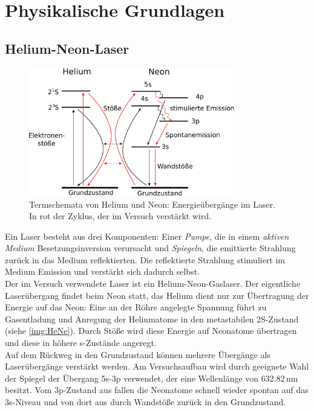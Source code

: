 \section{Physikalische Grundlagen}

\subsection{Helium-Neon-Laser}

\begin{figure}[H]
\begin{center}
  \includegraphics[width=0.8\textwidth]{../img/HeNe.pdf}
  \caption{Termschemata von Helium und Neon: Energieübergänge im Laser.
  In rot der Zyklus, der im Versuch verstärkt wird.}
  \label{img:HeNe}
\end{center}
\end{figure}


Ein Laser besteht aus drei Komponenten: Einer \emph{Pumpe},
die in einem \emph{aktiven Medium} Besetzungsinversion verursacht und \emph{Spiegeln},
die emittierte Strahlung zurück in das Medium reflektierten.
Die reflektierte Strahlung stimuliert im Medium Emission und verstärkt sich dadurch selbst.\\
Der im Versuch verwendete Laser ist ein Helium-Neon-Gaslaser.
Der eigentliche Laserübergang findet beim Neon statt, das Helium dient nur zur Übertragung der Energie
auf das Neon:
Eine an der Röhre angelegte Spannung führt zu Gasentladung und Anregung der Heliumatome
in den metastabilen 2S-Zustand
(siehe \autoref{img:HeNe}).
Durch Stöße wird diese Energie auf Neonatome übertragen und diese in höhere s-Zustände angeregt.\\
Auf dem Rückweg in den Grundzustand können mehrere Übergänge als Laserübergänge verstärkt werden.
Am Versuchsaufbau wird durch geeignete Wahl der Spiegel
der Übergang 5s-3p verwendet, der eine Wellenlänge von 632.82\,nm besitzt.
Vom 3p-Zustand aus fallen die Neonatome schnell wieder spontan auf das 3s-Niveau und von dort aus
durch Wandstöße zurück in den Grundzustand.



